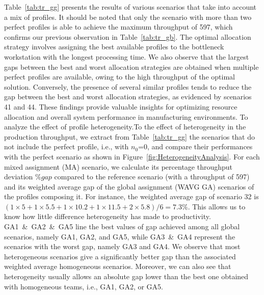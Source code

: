 \documentclass[review,12pt, 3p, times]{elsarticle}
\begin{document}
     
Table~\ref{tab:tr_gg} presents the results of various scenarios that take into account a mix of profiles. It should be noted that only the scenario with more than two perfect profiles is able to achieve the maximum throughput of 597, which confirms our previous observation in Table~\ref{tab:tr_gb}. The optimal allocation strategy involves assigning the best available profiles to the bottleneck workstation with the longest processing time. We also observe that the largest gaps between the best and worst allocation strategies are obtained when multiple perfect profiles are available, owing to the high throughput of the optimal solution. Conversely, the presence of several similar profiles tends to reduce the gap between the best and worst allocation strategies, as evidenced by scenarios 41 and 44. These findings provide valuable insights for optimizing resource allocation and  overall system performance in manufacturing environments. To analyze the effect of profile heterogeneity.To  the effect of  heterogeneity in the production throughput, we extract from Table~\ref{tab:tr_gg} the scenarios that do not include the perfect profile, i.e., with $n_0$=0, and compare their performances with the perfect scenario as shown in Figure~\ref{fig:HeterogeneityAnalysis}. For each mixed assignment (MA) scenario, we calculate its percentage throughput deviation $\%gap$ compared to the reference scenario (with a throughput of 597) and its weighted average gap of the global assignment (WAVG GA) scenarios of the profiles composing it. For instance, the weighted average gap of scenario 32 is $(1\times 5 + 1\times 5.5 + 1\times 10.2 + 1\times 11.5 + 2\times 5.8)/6 = 7.3\%$. This allows us to know how little difference heterogeneity has made to productivity. GA1~\&~GA2~\&~GA5 line  the best values of gap achieved among all global scenarios, namely GA1, GA2, and GA5, while GA3~\&~GA4 represent the scenarios with the worst gap, namely GA3 and GA4. We observe that most heterogeneous scenarios give a significantly better gap than the associated weighted average homogeneous scenarios. Moreover, we can also see that heterogeneity usually allows an absolute gap lower than the best one obtained with homogeneous teams, i.e., GA1, GA2, or GA5.
\end{document}
